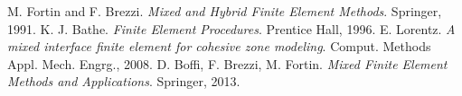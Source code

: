 \documentclass[11pt]{article}
\begin{document}

\begin{thebibliography}{10}
 M. Fortin and F. Brezzi. \emph{Mixed and Hybrid Finite Element Methods}. Springer, 1991.
 K. J. Bathe. \emph{Finite Element Procedures}. Prentice Hall, 1996.
 E. Lorentz. \emph{A mixed interface finite element for cohesive zone modeling}. Comput. Methods Appl. Mech. Engrg., 2008.
 D. Boffi, F. Brezzi, M. Fortin. \emph{Mixed Finite Element Methods and Applications}. Springer, 2013.
\end{thebibliography}
\end{document}
